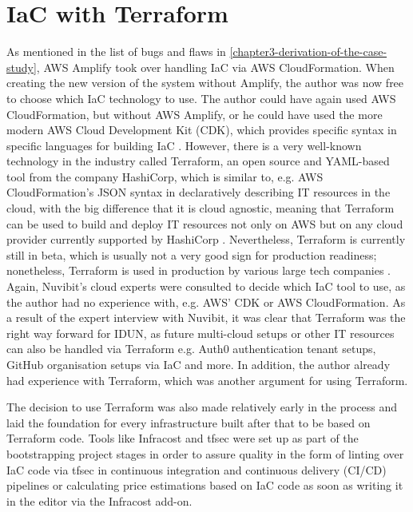 \section*{IaC with Terraform}
\label{chapter4-iac-with-terraform}

As mentioned in the list of bugs and flaws in \autoref{chapter3-derivation-of-the-case-study}, AWS Amplify took over handling IaC via AWS CloudFormation. When creating the new version of the system without Amplify, the author was now free to choose which IaC technology to use. The author could have again used AWS CloudFormation, but without AWS Amplify, or he could have used the more modern AWS Cloud Development Kit (CDK), which provides specific syntax in specific languages for building IaC \citep{amazon_web_services_inc_aws_nodate}. However, there is a very well-known technology in the industry called Terraform, an open source and YAML-based tool from the company HashiCorp, which is similar to, e.g. AWS CloudFormation's JSON syntax in declaratively describing IT resources in the cloud, with the big difference that it is cloud agnostic, meaning that Terraform can be used to build and deploy IT resources not only on AWS but on any cloud provider currently supported by HashiCorp \citep{hashicorp_browse_nodate}. Nevertheless, Terraform is currently still in beta, which is usually not a very good sign for production readiness; nonetheless, Terraform is used in production by various large tech companies \citep{stackshare_why_nodate}. Again, Nuvibit's cloud experts were consulted to decide which IaC tool to use, as the author had no experience with, e.g. AWS' CDK or AWS CloudFormation. As a result of the expert interview with Nuvibit, it was clear that Terraform was the right way forward for IDUN, as future multi-cloud setups or other IT resources can also be handled via Terraform e.g. Auth0 authentication tenant setups, GitHub organisation setups via IaC and more. In addition, the author already had experience with Terraform, which was another argument for using Terraform.

The decision to use Terraform was also made relatively early in the process and laid the foundation for every infrastructure built after that to be based on Terraform code. Tools like Infracost and tfsec were set up as part of the bootstrapping project stages in order to assure quality in the form of linting over IaC code via tfsec in continuous integration and continuous delivery (CI/CD) pipelines or calculating price estimations based on IaC code as soon as writing it in the editor via the Infracost add-on.

